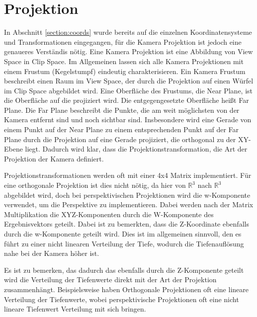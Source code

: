 \section{Projektion}
In Abschnitt \ref{section:coords} wurde bereits auf die einzelnen Koordinatensysteme und Transformationen eingegangen,
für die Kamera Projektion ist jedoch eine genaueres Verständis nötig.
Eine Kamera Projektion ist eine Abbildung von View Space in Clip Space.
Im Allgemeinen lassen sich alle Kamera Projektionen mit einem Frustum (Kegelstumpf) eindeutig charakterisieren.
Ein Kamera Frustum beschreibt einen Raum im View Space, 
der durch die Projektion auf einen Würfel im Clip Space abgebildet wird.
Eine Oberfläche des Frustums, die Near Plane, ist die Oberfläche auf die projiziert wird.
Die entgegengesetzte Oberfläche heißt Far Plane. 
Die Far Plane beschreibt die Punkte, die am weit möglichsten von der Kamera entfernt sind und noch sichtbar sind.
Insbesondere wird eine Gerade von einem Punkt auf der Near Plane zu einem entsprechenden Punkt auf der Far Plane
durch die Projektion auf eine Gerade projiziert, die orthogonal zu der XY-Ebene liegt.
Dadurch wird klar, dass die Projektionstransformation, die Art der Projektion der Kamera definiert.
\par
Projektionstransformationen werden oft mit einer 4x4 Matrix implementiert.
Für eine orthogonale Projektion ist dies nicht nötig, da hier von $\mathbb{R}^3$ nach $\mathbb{R}^3$ abgebildet wird,
doch bei perspektivischen Projektionen wird die w-Komponente verwendet, um die Perspektive zu implementieren.
Dabei werden nach der Matrix Multiplikation die XYZ-Komponenten durch die W-Komponente des Ergebnisvektors geteilt.
Dabei ist zu bemerkten, dass die Z-Koordinate ebenfalls durch die w-Komponente geteilt wird. 
Dies ist im allgemeinen sinnvoll, den es führt zu einer nicht linearen Verteilung der Tiefe, wodurch die Tiefenauflösung
nahe bei der Kamera höher ist.
\par
Es ist zu bemerken, das dadurch das ebenfalls durch die Z-Komponente geteilt wird die Verteilung der Tiefenwerte direkt mit der 
Art der Projektion zusammenhängt. Beispielsweise haben Orthogonale Projektionen oft eine lineare Verteilung der Tiefenwerte,
wobei perspektivische Projektionen oft eine nicht lineare Tiefenwert Verteilung mit sich bringen.

